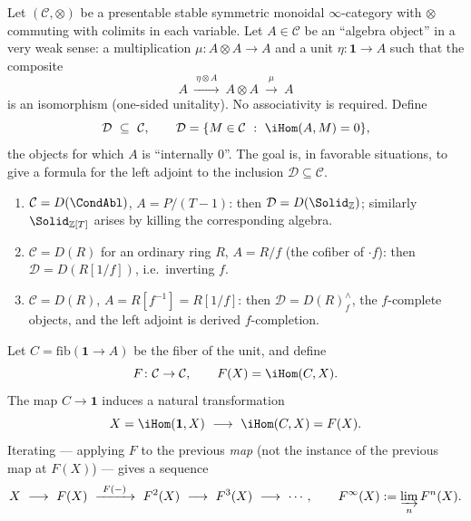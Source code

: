 \begin{definition}
\label{def:13:killing}
Let $(\mathcal C,\otimes)$ be a presentable stable symmetric monoidal
$\infty$-category with $\otimes$ commuting with colimits in each variable. Let
$A\in\mathcal C$ be an ``algebra object'' in a very weak sense: a multiplication
$\mu\colon A\otimes A\to A$ and a unit $\eta\colon \mathbf 1\to A$ such that the
composite
\begin{equation}
\label{eq:13:weak-unital}
A\ \xrightarrow{\ \eta\otimes A\ }\ A\otimes A\ \xrightarrow{\ \mu\ }\ A
\end{equation}
is an isomorphism (one-sided unitality). No associativity is required. Define
\begin{equation*}
\mathcal D\ \subseteq\ \mathcal C,\qquad \mathcal D=\{M\in\mathcal C\ :\ \iHom(A,M)=0\},
\end{equation*}
the objects for which $A$ is ``internally $0$''. The goal is, in favorable
situations, to give a formula for the left adjoint to the inclusion
$\mathcal D\subseteq\mathcal C$.
\end{definition}

\begin{example}
\label{ex:13:killing-examples}
\begin{enumerate}
\item $\mathcal C=D(\CondAbl)$, $A=P/(T-1)$: then $\mathcal D=D(\Solid_{\mathbb Z})$;
similarly $\Solid_{\mathbb Z[T]}$ arises by killing the corresponding algebra.
\item $\mathcal C=D(R)$ for an ordinary ring $R$, $A=R/f$ (the cofiber of
$\cdot f$): then $\mathcal D=D(R[1/f])$, i.e.\ inverting $f$.
\item $\mathcal C=D(R)$, $A=R[f^{-1}]=R[1/f]$: then $\mathcal D=D(R)^{\wedge}_f$,
the $f$-complete objects, and the left adjoint is derived $f$-completion.
\end{enumerate}
\end{example}

\begin{construction}
\label{constr:13:F}
Let $C=\mathrm{fib}(\mathbf 1\to A)$ be the fiber of the unit, and define
\begin{equation*}
F\colon\mathcal C\to\mathcal C,\qquad F(X)=\iHom(C,X).
\end{equation*}
The map $C\to\mathbf 1$ induces a natural transformation
\begin{equation*}
X=\iHom(\mathbf 1,X)\ \longrightarrow\ \iHom(C,X)=F(X).
\end{equation*}
Iterating --- applying $F$ to the previous \emph{map} (not the instance of the
previous map at $F(X)$) --- gives a sequence
\begin{equation}
\label{eq:13:iterate}
X\ \longrightarrow\ F(X)\ \xrightarrow{\ F(-)\ }\ F^2(X)\ \longrightarrow\ F^3(X)\ \longrightarrow\ \cdots,
\qquad
F^\infty(X):=\varinjlim_n F^n(X).
\end{equation}
\end{construction}

